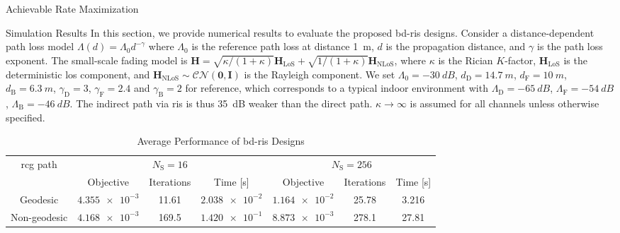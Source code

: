 \documentclass[journal]{IEEEtran}
\begin{document}
\begin{section}{Achievable Rate Maximization}


\end{section}

\begin{section}{Simulation Results}\label{sc:simulation}
	In this section, we provide numerical results to evaluate the proposed \gls{bd}-\gls{ris} designs.
	Consider a distance-dependent path loss model $\Lambda(d) = \Lambda_0 d^{-\gamma}$ where $\Lambda_0$ is the reference path loss at distance \qty{1}{m}, $d$ is the propagation distance, and $\gamma$ is the path loss exponent.
	The small-scale fading model is $\mathbf{H} = \sqrt{\kappa/(1+\kappa)} \mathbf{H}_\text{LoS} + \sqrt{1/(1+\kappa)} \mathbf{H}_\text{NLoS}$, where $\kappa$ is the Rician $K$-factor, $\mathbf{H}_\text{LoS}$ is the deterministic \gls{los} component, and $\mathbf{H}_\text{NLoS} \sim \mathcal{CN}(\mathbf{0}, \mathbf{I})$ is the Rayleigh component.
	We set $\Lambda_0=\qty{-30}{dB}$, $d_\mathrm{D}=\qty{14.7}{m}$, $d_\mathrm{F}=\qty{10}{m}$, $d_\mathrm{B}=\qty{6.3}{m}$, $\gamma_\mathrm{D}=3$, $\gamma_\mathrm{F}=2.4$ and $\gamma_\mathrm{B}=2$ for reference, which corresponds to a typical indoor environment with $\Lambda_\mathrm{D}=\qty{-65}{dB}$, $\Lambda_\mathrm{F}=\qty{-54}{dB}$, $\Lambda_\mathrm{B}=\qty{-46}{dB}$.
	The indirect path via \gls{ris} is thus \qty{35}{\dB} weaker than the direct path.
	$\kappa \to \infty$ is assumed for all channels unless otherwise specified.

	\begin{table}[!t]
		\caption{Average Performance of \gls{bd}-\gls{ris} Designs}
		\label{tb:complexity_test}
		\centering
		\begin{tabular}{ccccccc}
			\toprule
			\multirow{2}{*}{\gls{rcg} path} & \multicolumn{3}{c}{$N_\mathrm{S}=16$} & \multicolumn{3}{c}{$N_\mathrm{S}=256$}                                                                 \\ \cmidrule(lr){2-4} \cmidrule(lr){5-7}
			                                & Objective                              & Iterations                             & Time [s]         & Objective        & Iterations & Time [s]  \\ \midrule
			Geodesic                        & $\num{4.355e-3}$                       & 11.61                                  & $\num{2.038e-2}$ & $\num{1.164e-2}$ & 25.78      & 3.216     \\
			Non-geodesic                    & $\num{4.168e-3}$                       & 169.5                                  & $\num{1.420e-1}$ & $\num{8.873e-3}$ & 278.1      & 27.81     \\ \bottomrule
		\end{tabular}
	\end{table}


\end{section}
\end{document}
